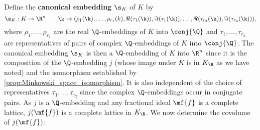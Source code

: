     Define the \textbf{canonical embedding} $\s_{K}$ of $K$ by
    \[
      \s_{K}:K \to \R^{n} \qquad \k \to (\rho_{1}(\k),\ldots,\rho_{r_{1}}(k),\Re(\tau_{1}(\k)),\Im(\tau_{1}(\k)),\ldots,\Re(\tau_{r_{2}}(\k)),\Im(\tau_{r_{2}}(\k))),
    \]
    where $\rho_{1},\ldots,\rho_{r_{1}}$ are the real $\Q$-embeddings of $K$ into $\conj{\Q}$ and $\tau_{1},\ldots,\tau_{r_{2}}$ are representatives of pairs of complex $\Q$-embeddings of $K$ into $\conj{\Q}$. The canonical embedding $\s_{K}$ is then a $\Q$-embedding of $K$ into $\R^{n}$ since it is the composition of the $\Q$-embedding $j$ (whose image under $K$ is in $K_{\R}$ as we have noted) and the isomorphism established by \cref{prop:Minkowski_space_isomorphism}. It is also independent of the choice of representatives $\tau_{1},\ldots,\tau_{r_{2}}$ since the complex $\Q$-embeddings occur in conjugate pairs. As $j$ is a $\Q$-embedding and any fractional ideal $\mf{f}$ is a complete lattice, $j(\mf{f})$ is a complete lattice in $K_{\R}$. We now determine the covolume of $j(\mf{f})$:

